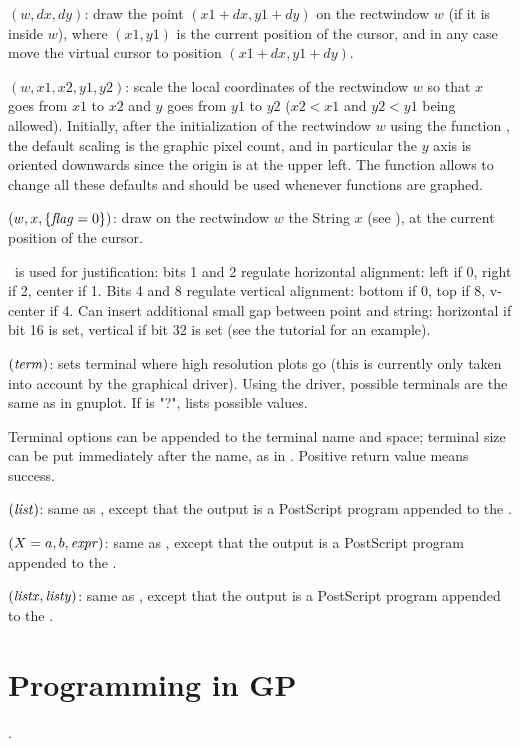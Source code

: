 $(w,dx,dy)$: draw the point $(x1+dx,y1+dy)$ on the
rectwindow $w$ (if it is inside $w$), where $(x1,y1)$ is the current position
of the cursor, and in any case move the virtual cursor to position
$(x1+dx,y1+dy)$.

$(w,x1,x2,y1,y2)$: scale the local coordinates of the
rectwindow $w$ so that $x$ goes from $x1$ to $x2$ and $y$ goes from $y1$ to
$y2$ ($x2<x1$ and $y2<y1$ being allowed). Initially, after the initialization
of the rectwindow $w$ using the function , the default scaling
is the graphic pixel count, and in particular the $y$ axis is oriented
downwards since the origin is at the upper left. The function 
allows to change all these defaults and should be used whenever functions are
graphed.

$(w,x,\{\hbox{\it f\kern0pt lag\/}=0\})$: draw on the rectwindow $w$ the
String $x$ (see ), at the current position of the cursor.

\fl\ is used for justification: bits 1 and 2 regulate horizontal alignment:
left if 0, right if 2, center if 1. Bits 4 and 8 regulate vertical
alignment: bottom if 0, top if 8, v-center if 4. Can insert additional
small gap between point and string: horizontal if bit 16 is set, vertical
if bit 32 is set (see the tutorial for an example).

$(\hbox{\it term\/})$: sets terminal where high resolution
plots go (this is currently only taken into account by the 
graphical driver). Using the  driver, possible terminals are
the same as in gnuplot. If  is "?", lists possible values.

Terminal options can be appended to the terminal name and space; terminal
size can be put immediately after the name, as in .
Positive return value means success.

$(\hbox{\it list\/})$: same as , except that the
output is a PostScript program appended to the .

$(X=a,b,\hbox{\it expr\/})$: same as , except that the
output is a PostScript program appended to the .

$(\hbox{\it listx\/},\hbox{\it listy\/})$: same as ,
except that the output is a PostScript program appended to the .

\section{Programming in GP}
\label{se:programming}
.

